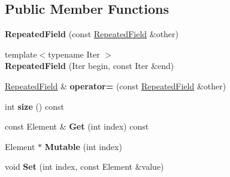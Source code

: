 \subsection*{Public Member Functions}
\begin{DoxyCompactItemize}
\item 
\mbox{\label{classgoogle_1_1protobuf_1_1RepeatedField_aff2fa0319619050ca4c6d887bec29efc}} 
{\bfseries Repeated\+Field} (const \hyperlink{classgoogle_1_1protobuf_1_1RepeatedField}{Repeated\+Field} \&other)
\item 
\mbox{\label{classgoogle_1_1protobuf_1_1RepeatedField_a54f1f838c1c4025d57928092238bc041}} 
{\footnotesize template$<$typename Iter $>$ }\\{\bfseries Repeated\+Field} (Iter begin, const Iter \&end)
\item 
\mbox{\label{classgoogle_1_1protobuf_1_1RepeatedField_abc97135183ce5dabf778ad2d6e3f739b}} 
\hyperlink{classgoogle_1_1protobuf_1_1RepeatedField}{Repeated\+Field} \& {\bfseries operator=} (const \hyperlink{classgoogle_1_1protobuf_1_1RepeatedField}{Repeated\+Field} \&other)
\item 
\mbox{\label{classgoogle_1_1protobuf_1_1RepeatedField_a31faaa92327fa8b29b23d3a9112e64e4}} 
int {\bfseries size} () const
\item 
\mbox{\label{classgoogle_1_1protobuf_1_1RepeatedField_ac65be183ab1684ebc382c41ab52d0764}} 
const Element \& {\bfseries Get} (int index) const
\item 
\mbox{\label{classgoogle_1_1protobuf_1_1RepeatedField_a4010af9c89d037a997a67a426d8dd930}} 
Element $\ast$ {\bfseries Mutable} (int index)
\item 
\mbox{\label{classgoogle_1_1protobuf_1_1RepeatedField_ad2d35e8a881346740cb4bd8dcc4a9747}} 
void {\bfseries Set} (int index, const Element \&value)
\item 
\mbox{\label{classgoogle_1_1protobuf_1_1RepeatedField_af1a3a8dc717c66ed746795ee3b80d42e}} 

\end{DoxyCompactItemize}
